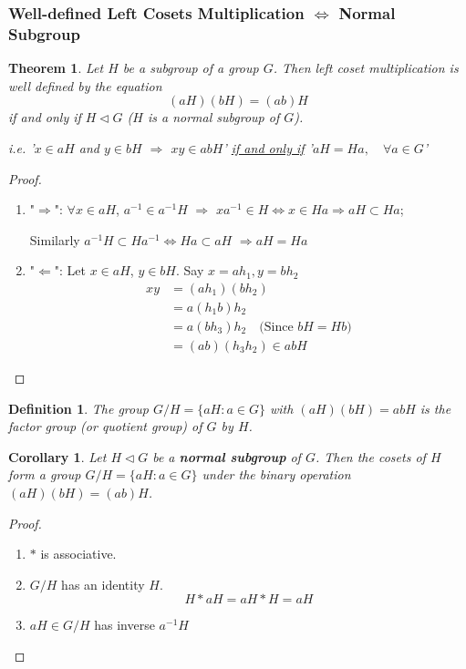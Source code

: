 \documentclass[11pt,a4paper]{article}
\newtheorem{theorem}{Theorem}
\newtheorem{corollary}{Corollary}
\newtheorem{definition}{Definition}
\begin{document}
\subsubsection{Well-defined Left Cosets Multiplication $\Leftrightarrow$ Normal Subgroup}
\begin{theorem}
    Let $H$ be a subgroup of a group $G$. Then left coset multiplication is well defined by the equation
    $$(aH)(bH) = (ab)H$$
    if and only if $H \lhd G$ ($H$ is a normal subgroup of $G$).

    i.e. '$x\in aH$ and $y\in bH$ $\Rightarrow$ $xy\in abH$' \underline{if and only if} '$aH=Ha,\quad \forall a\in G$'
\end{theorem}
\begin{proof}
    \quad

\begin{enumerate}[$\bullet$]
    \item "$\Rightarrow$": $\forall x\in aH$, $a^{-1}\in a^{-1}H$ $\Rightarrow$ $xa^{-1}\in H \Leftrightarrow x\in Ha \Rightarrow aH\subset Ha$;
    
    \quad Similarly $a^{-1}H\subset Ha^{-1} \Leftrightarrow	Ha\subset aH$ $\Rightarrow	aH=Ha$
    \item "$\Leftarrow$": Let $x\in aH$, $y\in bH$. Say $x=ah_1, y=bh_2$
    \begin{equation}
        \begin{aligned}
            xy&=(ah_1)(bh_2)\\
            &=a(h_1 b)h_2\\
            &=a(b h_3)h_2 \quad \text{(Since $bH=Hb$)}\\
            &=(ab)(h_3 h_2)\in abH
        \end{aligned}
        \nonumber
    \end{equation}
\end{enumerate}
\end{proof}

\begin{definition}
    The group $G/H=\{aH:a\in G\}$ with $(aH)(bH)=abH$ is the factor group (or quotient group) of
    $G$ by $H$.
\end{definition}
\begin{corollary}
    Let $H\lhd  G$ be a \textbf{normal subgroup} of $G$. Then the cosets of $H$ form a group $G/H=\{aH:a\in G\}$ under the
    binary operation $(aH)(bH) = (ab)H$.
\end{corollary}
\begin{proof}
\quad

\begin{enumerate}[$(1)$]
    \item $*$ is associative.
    \item $G/H$ has an identity $H$. $$H*aH=aH*H=aH$$
    \item $aH\in G/H$ has inverse $a^{-1}H$
\end{enumerate}
\end{proof}
\end{document}
